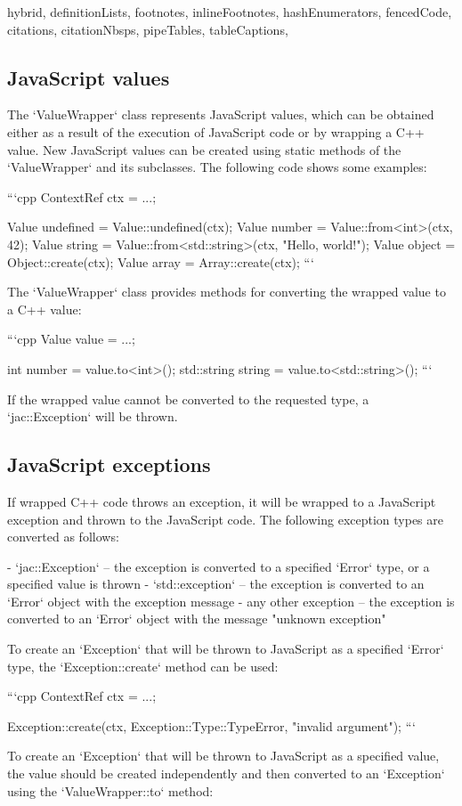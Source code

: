 \begin{markdown*}{%
  hybrid,
  definitionLists,
  footnotes,
  inlineFootnotes,
  hashEnumerators,
  fencedCode,
  citations,
  citationNbsps,
  pipeTables,
  tableCaptions,
}
\subsection{JavaScript values}

The `ValueWrapper` class represents JavaScript values, which can be obtained either as a result of the execution of JavaScript code or by wrapping a C++ value. New JavaScript values can be created using static methods of the `ValueWrapper` and its subclasses. The following code shows some examples:

```cpp
ContextRef ctx = ...;

Value undefined = Value::undefined(ctx);
Value number = Value::from<int>(ctx, 42);
Value string = Value::from<std::string>(ctx, "Hello, world!");
Value object = Object::create(ctx);
Value array = Array::create(ctx);
```

The `ValueWrapper` class provides methods for converting the wrapped value to a C++ value:

```cpp
Value value = ...;

int number = value.to<int>();
std::string string = value.to<std::string>();
```

If the wrapped value cannot be converted to the requested type, a `jac::Exception` will be thrown.

\subsection{JavaScript exceptions}

If wrapped C++ code throws an exception, it will be wrapped to a JavaScript exception and thrown to the JavaScript code. The following exception types are converted as follows:

  - `jac::Exception` -- the exception is converted to a specified `Error` type, or a specified value is thrown
  - `std::exception` -- the exception is converted to an `Error` object with the exception message
  - any other exception -- the exception is converted to an `Error` object with the message "unknown exception"

To create an `Exception` that will be thrown to JavaScript as a specified `Error` type, the `Exception::create` method can be used:

```cpp
ContextRef ctx = ...;

Exception::create(ctx, Exception::Type::TypeError, "invalid argument");
```

To create an `Exception` that will be thrown to JavaScript as a specified value, the value should be created independently and then converted to an `Exception` using the `ValueWrapper::to` method:


\end{markdown*}
